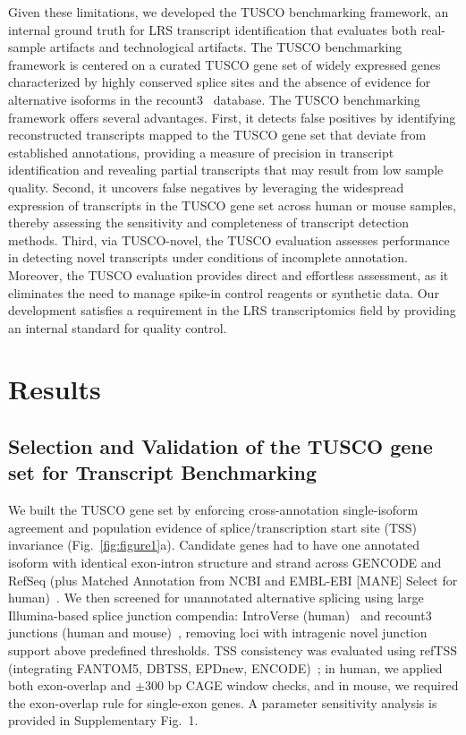 \documentclass[pdflatex,sn-nature]{sn-jnl}%
\newcommand{\tuscoGeneSet}{TUSCO gene set}
\newcommand{\tuscoBenchmarkingFramework}{TUSCO benchmarking framework}
\newcommand{\tuscoEvaluation}{TUSCO evaluation}
\newcommand{\tuscoNovel}{TUSCO-novel}
\begin{document}
Given these limitations, we developed the \tuscoBenchmarkingFramework{}, an internal ground truth for LRS transcript identification that evaluates both real-sample artifacts and technological artifacts. The \tuscoBenchmarkingFramework{} is centered on a curated \tuscoGeneSet{} of widely expressed genes characterized by highly conserved splice sites and the absence of evidence for alternative isoforms in the recount3~\cite{wilks_recount3_2021} database. The \tuscoBenchmarkingFramework{} offers several advantages. First, it detects false positives by identifying reconstructed transcripts mapped to the \tuscoGeneSet{} that deviate from established annotations, providing a measure of precision in transcript identification and revealing partial transcripts that may result from low sample quality. Second, it uncovers false negatives by leveraging the widespread expression of transcripts in the \tuscoGeneSet{} across human or mouse samples, thereby assessing the sensitivity and completeness of transcript detection methods. Third, via \tuscoNovel{}, the \tuscoEvaluation{} assesses performance in detecting novel transcripts under conditions of incomplete annotation. Moreover, the \tuscoEvaluation{} provides direct and effortless assessment, as it eliminates the need to manage spike-in control reagents or synthetic data. Our development satisfies a requirement in the LRS transcriptomics field by providing an internal standard for quality control.


\section{Results}

\subsection{Selection and Validation of the \tuscoGeneSet{} for Transcript Benchmarking}

We built the \tuscoGeneSet{} by enforcing cross-annotation single-isoform agreement and population evidence of splice/transcription start site (TSS) invariance (Fig.~\ref{fig:figure1}a). Candidate genes had to have one annotated isoform with identical exon-intron structure and strand across GENCODE and RefSeq (plus Matched Annotation from NCBI and EMBL-EBI [MANE] Select for human)~\cite{mudge_gencode_2025,goldfarb_ncbi_2025,morales_joint_2022}. We then screened for unannotated alternative splicing using large Illumina-based splice junction compendia: IntroVerse (human)~\cite{garcia-ruiz_introverse_2023} and recount3 junctions (human and mouse)~\cite{wilks_recount3_2021}, removing loci with intragenic novel junction support above predefined thresholds. TSS consistency was evaluated using refTSS (integrating FANTOM5, DBTSS, EPDnew, ENCODE)~\cite{abugessaisa_reftss_2019}; in human, we applied both exon-overlap and $\pm 300$ bp CAGE window checks, and in mouse, we required the exon-overlap rule for single-exon genes. A parameter sensitivity analysis is provided in Supplementary Fig.~1.
\end{document}
